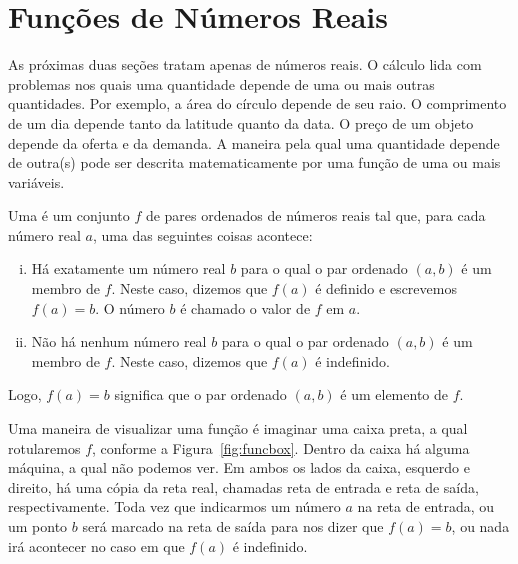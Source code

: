 \documentclass{svmono}
\begin{document}





\section{Funções de Números Reais}
\label{sec:funcreal}

As próximas duas seções tratam apenas de números reais. O cálculo
lida com problemas nos quais uma quantidade depende de uma ou mais
outras quantidades. Por exemplo, a área do círculo depende de seu
raio. O comprimento de um dia depende tanto da latitude quanto da
data. O preço de um objeto depende da oferta e da demanda. A maneira
pela qual uma quantidade depende de outra(s) pode ser descrita
matematicamente por uma função de uma ou mais variáveis.

\begin{defin}
Uma  é um conjunto $f$ de pares
ordenados de números reais tal que, para cada número real $a$, uma
das seguintes coisas acontece:

\begin{enumerate}[(i)]
\item Há exatamente um número real $b$ para o qual o par ordenado $(a,b)$
é um membro de $f$. Neste caso, dizemos que $f(a)$ é definido e
escrevemos $f(a) = b$. O número $b$ é chamado o valor de $f$ em $a$.
\item Não há nenhum número real $b$ para o qual o par ordenado $(a,b)$
é um membro de $f$. Neste caso, dizemos que $f(a)$ é indefinido.
\end{enumerate}
\end{defin}

Logo, $f(a) = b$ significa que o par ordenado $(a,b)$ é um elemento
de $f$.

Uma maneira de visualizar uma função é imaginar uma caixa preta, a qual
rotularemos $f$, conforme a Figura~\ref{fig:funcbox}. Dentro da caixa há
alguma máquina, a qual não podemos ver. Em ambos os lados da caixa,
esquerdo e direito, há uma cópia da reta real, chamadas reta de entrada
e reta de saída, respectivamente. Toda vez que indicarmos um número $a$
na reta de entrada, ou um ponto $b$ será marcado na reta de saída para
nos dizer que $f(a) = b$, ou nada irá acontecer no caso em que $f(a)$
é indefinido.
\end{document}
